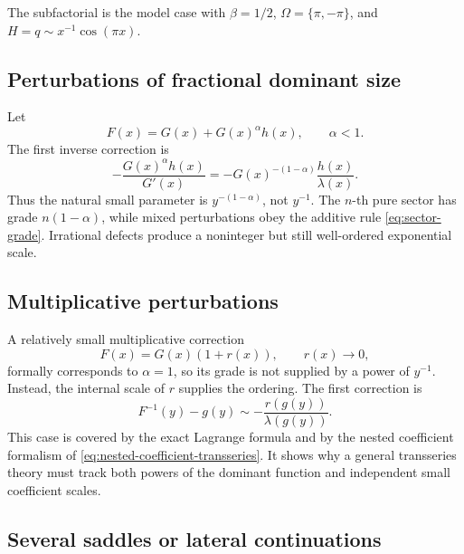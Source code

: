 \documentclass[11pt,oneside]{article}
\theoremstyle{plain}
\theoremstyle{definition}
\theoremstyle{remark}
\begin{document}
The subfactorial is the model case with \(\beta=1/2\),
\(\Omega=\{\pi,-\pi\}\), and \(H=q\sim x^{-1}\cos(\pi x)\).

\subsection{Perturbations of fractional dominant size}

Let
\begin{equation}
 F(x)=G(x)+G(x)^\alpha h(x),\qquad \alpha<1.
 \label{eq:fractional-perturbation}
\end{equation}
The first inverse correction is
\begin{equation}
 -\frac{G(x)^\alpha h(x)}{G'(x)}
 =-G(x)^{-(1-\alpha)}\frac{h(x)}{\lambda(x)}.
 \label{eq:fractional-first}
\end{equation}
Thus the natural small parameter is \(y^{-(1-\alpha)}\), not \(y^{-1}\).
The \(n\)-th pure sector has grade \(n(1-\alpha)\), while mixed perturbations
obey the additive rule \eqref{eq:sector-grade}.  Irrational defects produce a
noninteger but still well-ordered exponential scale.

\subsection{Multiplicative perturbations}

A relatively small multiplicative correction
\begin{equation}
 F(x)=G(x)(1+r(x)),\qquad r(x)\to0,
 \label{eq:multiplicative-perturbation}
\end{equation}
formally corresponds to \(\alpha=1\), so its grade is not supplied by a power
of \(y^{-1}\).  Instead, the internal scale of \(r\) supplies the ordering.
The first correction is
\begin{equation}
 F^{-1}(y)-g(y)\sim-\frac{r(g(y))}{\lambda(g(y))}.
 \label{eq:multiplicative-first}
\end{equation}
This case is covered by the exact Lagrange formula and by the nested
coefficient formalism of \eqref{eq:nested-coefficient-transseries}.  It shows
why a general transseries theory must track both powers of the dominant
function and independent small coefficient scales.

\subsection{Several saddles or lateral continuations}
\end{document}
